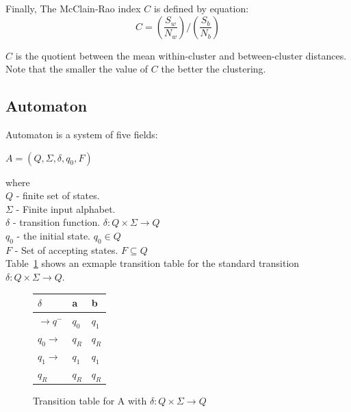 \documentclass{article}
\begin{document}
Finally, The McClain-Rao index $C$ is defined by equation: 
\begin{equation}
	C =  (\frac{S_w}{N_w}) / (\frac{S_b}{N_b})
\end{equation}

$C$ is the quotient between the mean within-cluster and between-cluster distances.
Note that the smaller the value of $C$ the better the clustering.

\subsection{Automaton} \label{sec:autom}
Automaton is a system of five fields:
\begin{center}
	$A = (Q, \Sigma, \delta, q_0, F)$
\end{center}

where \\
$Q$ - finite set of states. \\
$\Sigma$ - Finite input alphabet. \\
$\delta$ - transition function. $\delta: Q \times \Sigma \rightarrow Q$ \\
$q_0$ - the initial state. $q_0 \in Q$ \\
$F$ - Set of accepting states. $F \subseteq Q$ \\

Table~\ref{fig:ttable_std} shows an exmaple transition table for the standard transition $\delta: Q \times \Sigma \rightarrow Q$.

%
%
\begin{figure}[H]
\CenterFloatBoxes
\begin{floatrow}

\ttabbox
  {
  \centering
  \setlength{\tabcolsep}{15pt}
	\renewcommand{\arraystretch}{1.5}
	\begin{tabular}{|P{1.0cm} || P{0.6cm} | P{0.6cm} |}
	\hline
	$\delta$ & a & b \\
	\hline
	\hline
	$\rightarrow q^-$ 		& $q_0$ & $q_1$ \\
	\hline
	$q_0 \rightarrow$ 		& $q_R$ & $q_R$ \\
	\hline
	$q_1 \rightarrow$ 		& $q_1$ & $q_1$ \\
	\hline
	$q_R$  					& $q_R$ & $q_R$ \\
	\hline
	\end{tabular}
  }
  {\caption{Transition table for A with $\delta: Q \times \Sigma \rightarrow Q$}\label{fig:ttable_std}}


\end{floatrow}
\end{figure}
\end{document}
